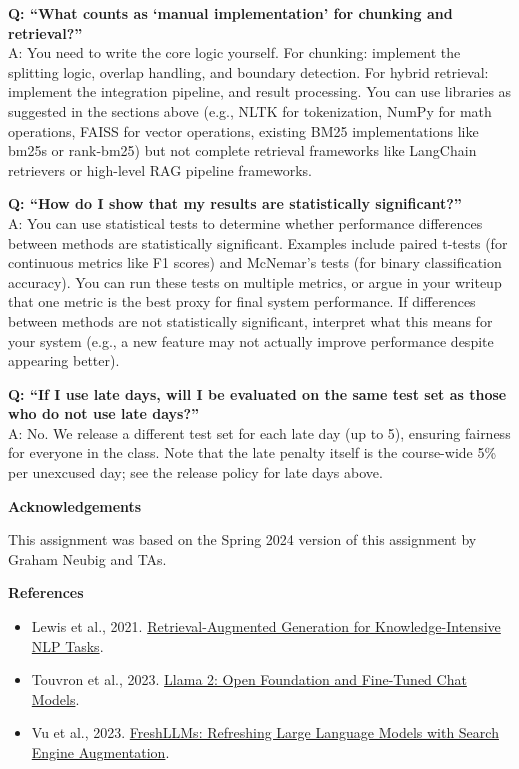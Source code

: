 \documentclass[11pt]{article}
\newcommand{\problem}[1]{%
  \vspace{1em}
  \noindent\colorbox{headerblue}{\parbox{\dimexpr\textwidth-2\fboxsep}{%
    \vspace{2pt}\textbf{\large #1}\vspace{2pt}}}
  \vspace{0.6em}
}
\begin{document}
\vspace{0.6em}
\noindent\textbf{Q: ``What counts as `manual implementation' for chunking and retrieval?''}\\
A: You need to write the core logic yourself. For chunking: implement the splitting logic, overlap
handling, and boundary detection. For hybrid retrieval: implement the integration pipeline, and result
processing. You can use libraries as suggested in the sections above (e.g., NLTK for tokenization,
NumPy for math operations, FAISS for vector operations, existing BM25 implementations like bm25s or
rank-bm25) but not complete retrieval frameworks like LangChain retrievers or high-level RAG pipeline
frameworks.

\vspace{0.6em}
\noindent\textbf{Q: ``How do I show that my results are statistically significant?''}\\
A: You can use statistical tests to determine whether performance differences between methods are
statistically significant. Examples include paired t-tests (for continuous metrics like F1 scores) and
McNemar's tests (for binary classification accuracy). You can run these tests on multiple metrics, or
argue in your writeup that one metric is the best proxy for final system performance. If differences
between methods are not statistically significant, interpret what this means for your system (e.g., a
new feature may not actually improve performance despite appearing better).

\vspace{0.6em}
\noindent\textbf{Q: ``If I use late days, will I be evaluated on the same test set as those who do not
use late days?''}\\
A: No. We release a different test set for each late day (up to 5), ensuring fairness for everyone
in the class. Note that the late penalty itself is the course-wide 5\% per unexcused day; see the
release policy for late days above.

\problem{Acknowledgements}

\noindent This assignment was based on the Spring 2024 version of this assignment by Graham Neubig and
TAs.

\problem{References}

\begin{itemize}[nosep, leftmargin=2em]
  \item Lewis et al., 2021. \href{https://arxiv.org/abs/2005.11401}{Retrieval-Augmented Generation for
    Knowledge-Intensive NLP Tasks}.
  \item Touvron et al., 2023. \href{https://arxiv.org/abs/2307.09288}{Llama 2: Open Foundation and
    Fine-Tuned Chat Models}.
  \item Vu et al., 2023. \href{https://arxiv.org/abs/2310.03214}{FreshLLMs: Refreshing Large Language
    Models with Search Engine Augmentation}.
\end{itemize}
\end{document}
